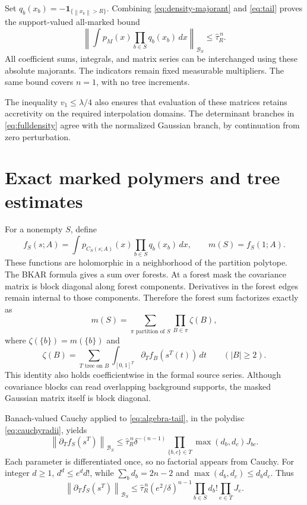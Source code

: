 \documentclass[11pt]{article}
\newcommand{\Bcal}{\mathcal B}
\newcommand{\one}{\mathbf 1}
\newcommand{\norm}[1]{\left\|#1\right\|}
\begin{document}
Set $q_b(x_b)=-\one_{\{\norm{x_b}>R\}}$.
Combining \eqref{eq:density-majorant} and \eqref{eq:tail} proves
the support-valued all-marked bound
\begin{equation}
 \left\|\int p_M(x)\prod_{b\in S}q_b(x_b)\,dx
       \right\|_{\Bcal_S}
 \le\widehat\tau_R^{\,n}.
 \label{eq:algebra-tail}
\end{equation}
All coefficient sums, integrals, and matrix series can be interchanged
using these absolute majorants. The indicators remain fixed measurable
multipliers. The same bound covers $n=1$, with no tree increments.

The inequality $v_1\le\lambda/4$ also ensures that evaluation of these
matrices retains accretivity on the required interpolation domains.
The determinant branches in \eqref{eq:fulldensity} agree with the
normalized Gaussian branch, by continuation from zero perturbation.

\section{Exact marked polymers and tree estimates}

For a nonempty $S$, define
\[
 f_S(s;A)=\int p_{C_S(s;A)}(x)\prod_{b\in S}q_b(x_b)\,dx,
 \qquad m(S)=f_S(1;A).
\]
These functions are holomorphic in a neighborhood of the partition
polytope. The BKAR formula \cite{AR,BKARnotes} gives a sum over forests.
At a forest mask the covariance matrix is block diagonal along forest
components. Derivatives in the forest edges remain internal to those
components. Therefore the forest sum factorizes exactly as
\begin{equation}
 m(S)=\sum_{\pi\text{ partition of }S}
                         \prod_{B\in\pi}\zeta(B),
 \label{eq:moment-partition}
\end{equation}
where $\zeta(\{b\})=m(\{b\})$ and
\begin{equation}
 \zeta(B)=\sum_{T\text{ tree on }B}\int_{[0,1]^T}
                          \partial_T f_B(s^T(t))\,dt
                  \qquad(|B|\ge2).
 \label{eq:zeta}
\end{equation}
This identity also holds coefficientwise in the formal source series.
Although covariance blocks can read overlapping background supports,
the masked Gaussian matrix itself is block diagonal.

Banach-valued Cauchy applied to \eqref{eq:algebra-tail}, in the
polydisc \eqref{eq:cauchyradii}, yields
\[
 \norm{\partial_Tf_S(s^T)}_{\Bcal_S}
 \le\widehat\tau_R^{\,n}\delta^{-(n-1)}
       \prod_{\{b,c\}\in T}\max(d_b,d_c)J_{bc}.
\]
Each parameter is differentiated once, so no factorial appears from
Cauchy. For integer $d\ge1$, $d^d\le e^d d!$, while
$\sum_bd_b=2n-2$ and $\max(d_b,d_c)\le d_bd_c$.
Thus
\begin{equation}
 \norm{\partial_Tf_S(s^T)}_{\Bcal_S}
 \le\widehat\tau_R^{\,n}(e^2/\delta)^{n-1}
                         \prod_{b\in S}d_b!\prod_{e\in T}J_e.
 \label{eq:tree-bound}
\end{equation}
\end{document}
